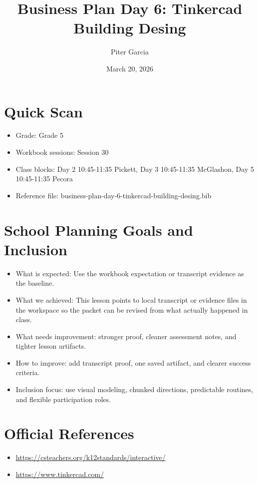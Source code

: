 \documentclass[11pt]{article}
\title{Business Plan Day 6: Tinkercad Building Desing}
\author{Piter Garcia}
\date{March 20, 2026}
\begin{document}
    \maketitle
    \section*{Quick Scan}
    \begin{itemize}[leftmargin=*]
    \item Grade: Grade 5
    \item Workbook sessions: Session 30
    \item Class blocks: Day 2 10:45-11:35 Pickett, Day 3 10:45-11:35 McGlashon, Day 5 10:45-11:35 Pecora
    \item Reference file: business-plan-day-6-tinkercad-building-desing.bib
    \end{itemize}
    \section*{School Planning Goals and Inclusion}
    \begin{itemize}[leftmargin=*]
    \item What is expected: Use the workbook expectation or transcript evidence as the baseline.
    \item What we achieved: This lesson points to local transcript or evidence files in the workspace so the packet can be revised from what actually happened in class.
    \item What needs improvement: stronger proof, cleaner assessment notes, and tighter lesson artifacts.
    \item How to improve: add transcript proof, one saved artifact, and clearer success criteria.
    \item Inclusion focus: use visual modeling, chunked directions, predictable routines, and flexible participation roles.
    \end{itemize}
    \section*{Official References}
    \begin{itemize}[leftmargin=*]
    \item \url{https://csteachers.org/k12standards/interactive/}
\item \url{https://www.tinkercad.com/}

    \end{itemize}
    
\end{document}
